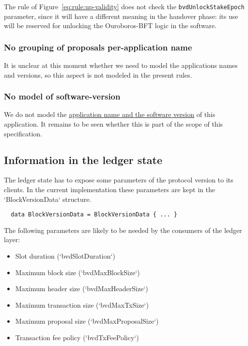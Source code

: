 The rule of Figure~\ref{eq:rule:up-validity} does not check the
\lstinline{bvdUnlockStakeEpoch} parameter, since it will have a different
meaning in the handover phase: its use will be reserved for unlocking the
Ouroboros-BFT logic in the software.

\subsubsection{No grouping of proposals per-application name}
\label{sec:no-app-up-grouping}

It is unclear at this moment whether we need to model the applications names
and versions, so this aspect is not modeled in the present rules.

\subsubsection{No model of software-version}
\label{sec:no-model-software-version}

We do not model the
\href{https://github.com/input-output-hk/cardano-sl/blob/develop/docs/block-processing/us.md#software-version}{application
  name and the software version} of this application. It remains to be seen
whether this is part of the scope of this specification.


\subsection{Information in the ledger state}
\label{sec:information-in-ledger-state}

The ledger state has to expose some parameters of the protocol version to its
clients. In the current implementation these parameters are kept in the
`BlockVersionData` structure.

\begin{lstlisting}
  data BlockVersionData = BlockVersionData { ... }
\end{lstlisting}

The following parameters are likely to be needed by the consumers of the ledger
layer:

\begin{itemize}
\item Slot duration (`bvdSlotDuration`)
\item Maximum block size (`bvdMaxBlockSize`)
\item Maximum header size (`bvdMaxHeaderSize`)
\item Maximum transaction size (`bvdMaxTxSize`)
\item Maximum proposal size (`bvdMaxProposalSize`)
\item Transaction fee policy (`bvdTxFeePolicy`)
\end{itemize}

